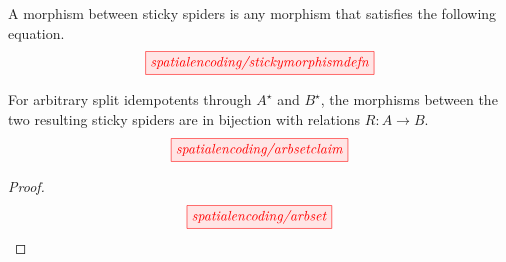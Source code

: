 \begin{defn}
A morphism between sticky spiders is any morphism that satisfies the following equation.
\[\scalebox{1}{\tikzfig{spatialencoding/stickymorphismdefn}}\]
\end{defn}

\begin{proposition}
For arbitrary split idempotents through $A^\star$ and $B^\star$, the morphisms between the two resulting sticky spiders are in bijection with relations $R: A \rightarrow B$.
\[\scalebox{1}{\tikzfig{spatialencoding/arbsetclaim}}\]
\begin{proof}
\[\scalebox{1}{\tikzfig{spatialencoding/arbset}}\]
\end{proof}
\end{proposition}


